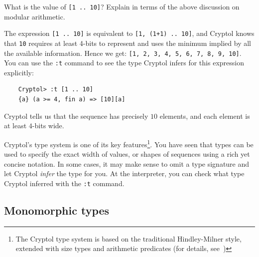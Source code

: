 \begin{Exercise}\label{ex:arith:10}
  What is the value of {\tt [1 .. 10]}? Explain in terms of the above
  discussion on modular arithmetic.\indModular
\end{Exercise}
\begin{Answer}
  The expression {\tt [1 .. 10]} is equivalent to {\tt [1, (1+1)
    .. 10]}, and Cryptol knows that {\tt 10} requires at least 4-bits
  to represent and uses the minimum implied by all the available
  information. Hence we get: {\tt [1, 2, 3, 4, 5, 6, 7, 8, 9, 10]}.
  You can use the {\tt :t} command to see the type Cryptol infers for
  this expression explicitly:
\begin{Verbatim}
    Cryptol> :t [1 .. 10]
    {a} (a >= 4, fin a) => [10][a]
\end{Verbatim}
Cryptol tells us that the sequence has precisely $10$ elements, and each
element is at least $4$-bits wide.
\end{Answer}


Cryptol's type system is one of its key features\footnote{The Cryptol
  type system is based on the traditional Hindley-Milner style,
  extended with size types and arithmetic
  predicates (for details, see~\cite{erkok-carlsson-wick-cryptolCoverification-09,
    erkok-matthews-cryptolEqChecking-09, Hin97})}.  You have seen that
types can be used to specify the exact width of values, or shapes of
sequences using a rich yet concise notation.  In some cases, it may
make sense to omit a type signature and let Cryptol {\em infer} the
type for you. At the interpreter, you can check what type Cryptol
inferred with the {\tt :t} command.


\subsection{Monomorphic types}\indMonomorphism
\label{sec:monomorphic-types}

